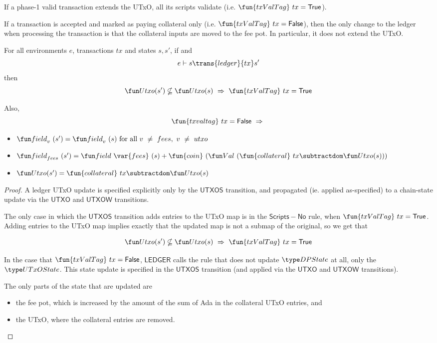 \begin{property}
  \label{prop:fees-only}

  If a phase-1 valid transaction extends the UTxO, all its scripts validate
  (i.e. $\fun{txValTag}~tx = \True$).

  If a transaction is accepted and marked as paying collateral only
  (i.e. $\fun{txValTag}~tx = \False$), then the only change to the ledger
  when processing the transaction is that the collateral inputs
  are moved to the fee pot. In particular, it does not extend the UTxO.

  \begin{lemma}
    For all environments $e$, transactions $tx$ and states $s, s'$, if  and
    \begin{equation*}
      e\vdash s\trans{ledger}{tx}s'
    \end{equation*}
    then
    \[\Utxo(s') \nsubseteq \Utxo(s)~\Rightarrow~\fun{txValTag}~tx = \True \]

    Also,
    \[\fun{txvaltag}~tx = \False~ \Rightarrow~\]
    \begin{itemize}
      \item $ \field_{v}~(s') = \field_{v}~(s) \text{ for all } v~\neq~{fees}, ~v~\neq~{utxo}$
      \item $\field_{fees}~(s') = \field~\var{fees}~(s) + \fun{coin}~(\Val~(\fun{collateral}~{tx} \subtractdom \Utxo(s)))$
      \item $\Utxo(s') = \fun{collateral}~{tx} \subtractdom \Utxo(s)$
    \end{itemize}
  \end{lemma}

  \begin{proof}
    A ledger UTxO update is specified explicitly only by the $\mathsf{UTXOS}$ transition,
    and propagated (ie. applied as-specified) to a chain-state update via the
    $\mathsf{UTXO}$ and $\mathsf{UTXOW}$ transitions.

    The only case in which the $\mathsf{UTXOS}$ transition adds entries to the UTxO
    map is in the $\mathsf{Scripts-No}$ rule, when $\fun{txValTag}~tx = \True$.
    Adding entries to the UTxO map implies exactly that the updated map is not a
    submap of the original, so we get that

    \[\Utxo(s') \nsubseteq \Utxo(s)~\Rightarrow~\fun{txValTag}~tx = \True \]

   In the case that $\fun{txValTag}~tx = \False$, $\mathsf{LEDGER}$ calls the rule
   that does not update $\DPState$ at all, only the $\UTxOState$. This state update is specified
   in the $\mathsf{UTXOS}$ transition (and applied via the $\mathsf{UTXO}$ and $\mathsf{UTXOW}$ transitions).

   The only parts of the state that are updated are
   \begin{itemize}
     \item the fee pot, which is increased by the amount of the sum of Ada in the
     collateral UTxO entries, and
     \item the UTxO, where the collateral entries
     are removed.
   \end{itemize}
  \end{proof}
\end {property}

